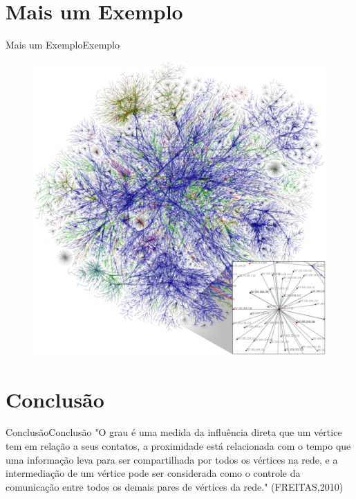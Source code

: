\documentclass[10pt]{beamer}
\begin{document}
\section{Mais um Exemplo}
\begin{frame}{Mais um Exemplo}{Exemplo}
\begin{figure}[htp]
     \centering
     \includegraphics[scale=0.18]{Internet_map_1024_-_transparent.png}
      \label{fig:vianet}
\end{figure}
\end{frame}

\section{Conclusão}
\begin{frame}{Conclusão}{Conclusão}
"O grau é uma medida da influência direta que um vértice tem em relação a seus contatos, a 
proximidade está relacionada com o tempo que uma informação leva para ser compartilhada por todos os vértices na rede, e a intermediação de um vértice pode ser considerada como o controle da comunicação entre todos os demais pares de vértices da rede." (FREITAS,2010)
\end{frame}
{\aauwavesbg
\begin{frame}
\end{frame}}
\end{document}
